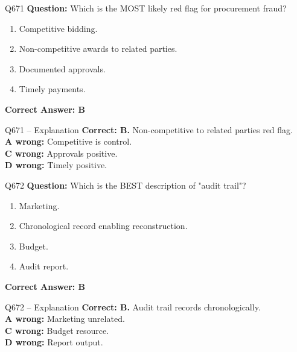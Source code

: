 \documentclass[aspectratio=169,10pt]{beamer}
\begin{document}
	\begin{frame}[t]{Q671}
		\small
		\textbf{Question:} Which is the MOST likely red flag for procurement fraud?
		\begin{enumerate}[label=\Alph*.,itemsep=1pt,topsep=2pt]
			\item Competitive bidding.
			\item Non-competitive awards to related parties.
			\item Documented approvals.
			\item Timely payments.
		\end{enumerate}
		\vspace{4pt}
		\textbf{Correct Answer: B}
	\end{frame}
	
	\begin{frame}[t]{Q671 -- Explanation}
		\small
		\textbf{Correct: B.} Non-competitive to related parties red flag. \\[4pt]
		\textbf{A wrong:} Competitive is control. \\[2pt]
		\textbf{C wrong:} Approvals positive. \\[2pt]
		\textbf{D wrong:} Timely positive.
	\end{frame}
	
	\begin{frame}[t]{Q672}
		\small
		\textbf{Question:} Which is the BEST description of "audit trail"?
		\begin{enumerate}[label=\Alph*.,itemsep=1pt,topsep=2pt]
			\item Marketing.
			\item Chronological record enabling reconstruction.
			\item Budget.
			\item Audit report.
		\end{enumerate}
		\vspace{4pt}
		\textbf{Correct Answer: B}
	\end{frame}
	
	\begin{frame}[t]{Q672 -- Explanation}
		\small
		\textbf{Correct: B.} Audit trail records chronologically. \\[4pt]
		\textbf{A wrong:} Marketing unrelated. \\[2pt]
		\textbf{C wrong:} Budget resource. \\[2pt]
		\textbf{D wrong:} Report output.
	\end{frame}
	
\end{document}
